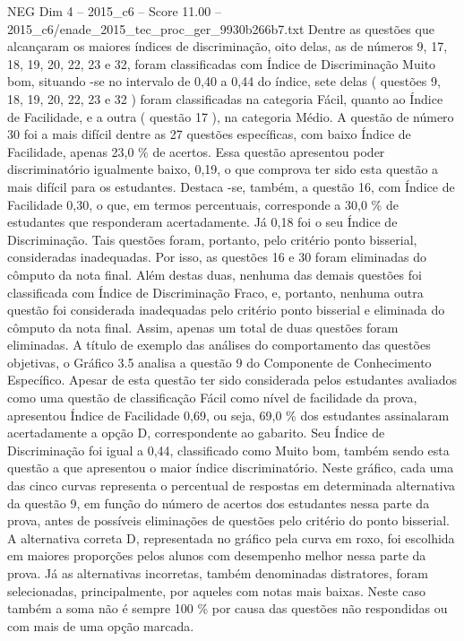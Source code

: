 \begin{textsample}{NEG Dim 4 – 2015\_c6 – Score 11.00 – 2015\_c6/enade\_2015\_tec\_proc\_ger\_9930b266b7.txt}
Dentre as questões que alcançaram os maiores índices de discriminação, oito delas, as de números 9, 17, 18, 19, 20, 22, 23 e 32, foram classificadas com Índice de Discriminação Muito bom, situando -se no intervalo de 0,40 a 0,44 do índice, sete delas ( questões 9, 18, 19, 20, 22, 23 e 32 ) foram classificadas na categoria Fácil, quanto ao Índice de Facilidade, e a outra ( questão 17 ), na categoria Médio.
A questão de número 30 foi a mais difícil dentre as 27 questões específicas, com baixo Índice de Facilidade, apenas 23,0 \% de acertos.
Essa questão apresentou poder discriminatório igualmente baixo, 0,19, o que comprova ter sido esta questão a mais difícil para os estudantes.
Destaca -se, também, a questão 16, com Índice de Facilidade 0,30, o que, em termos percentuais, corresponde a 30,0 \% de estudantes que responderam acertadamente.
Já 0,18 foi o seu Índice de Discriminação.
Tais questões foram, portanto, pelo critério ponto bisserial, consideradas inadequadas.
Por isso, as questões 16 e 30 foram eliminadas do cômputo da nota final.
Além destas duas, nenhuma das demais questões foi classificada com Índice de Discriminação Fraco, e, portanto, nenhuma outra questão foi considerada inadequadas pelo critério ponto bisserial e eliminada do cômputo da nota final.
Assim, apenas um total de duas questões foram eliminadas.
A título de exemplo das análises do comportamento das questões objetivas, o Gráfico 3.5 analisa a questão 9 do Componente de Conhecimento Específico.
Apesar de esta questão ter sido considerada pelos estudantes avaliados como uma questão de classificação Fácil como nível de facilidade da prova, apresentou Índice de Facilidade 0,69, ou seja, 69,0 \% dos estudantes assinalaram acertadamente a opção D, correspondente ao gabarito.
Seu Índice de Discriminação foi igual a 0,44, classificado como Muito bom, também sendo esta questão a que apresentou o maior índice discriminatório.
Neste gráfico, cada uma das cinco curvas representa o percentual de respostas em determinada alternativa da questão 9, em função do número de acertos dos estudantes nessa parte da prova, antes de possíveis eliminações de questões pelo critério do ponto bisserial.
A alternativa correta D, representada no gráfico pela curva em roxo, foi escolhida em maiores proporções pelos alunos com desempenho melhor nessa parte da prova.
Já as alternativas incorretas, também denominadas distratores, foram selecionadas, principalmente, por aqueles com notas mais baixas.
Neste caso também a soma não é sempre 100 \% por causa das questões não respondidas ou com mais de uma opção marcada.

\end{textsample}
